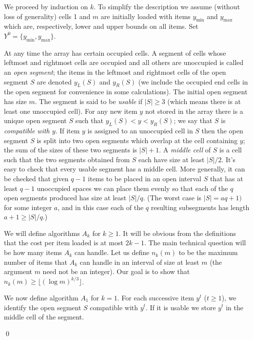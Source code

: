 \documentclass[unicode,review]{siamart1116}
\newenvironment{proofof}[1]{\noindent{\textbf { Proof of #1:}}} {{\qed}}
\numberwithin{theorem}{section}
\begin{document}
\begin{proofof}{\Cref{thm:ub}}
We proceed by induction on $k$. To simplify the description we assume (without loss of generality)
cells 1 and $m$ are initially loaded with items $y_{\min}$ and $y_{\max}$ which are, respectively, lower and upper bounds
on all items. Set $Y^0 = \{y_{\min}, y_{\max}\}$.



At any time the array has certain occupied cells.   A segment of cells whose leftmost and rightmost cells are occupied
and all others are unoccupied is called an {\em open segment}; the items in the leftmost and rightmost cells of the open segment
$S$ are denoted $y_L(S)$ and $y_R(S)$ (we include the occupied end cells in the open segment for convenience
in some calculations).  The initial open segment has size $m$.
The segment is said to be {\em usable} if $|S| \geq 3$ (which means there is at least one unoccupied cell).
For any new item $y$ not stored in the array
there is a unique open segment $S$ such that $y_L(S)<y<y_R(S)$; we say that $S$ is  {\em compatible with $y$}.
If item $y$ is assigned to an unoccupied cell in $S$  then the open segment $S$ is split into two open
segments which overlap at the cell containing $y$; the sum of the sizes of these two segments is $|S|+1$.
A {\em middle cell} of $S$ is a cell such that the two segments obtained from $S$ each have size at least $|S|/2$. It's easy
to check that every usable segment has a middle cell.  More generally, it can be checked that given $q-1$ items to be placed in an open
interval $S$ that has at least $q-1$ unoccupied spaces we can place them evenly so that each of the $q$
open segments produced has size at least $|S|/q$.  (The worst case is $|S|=aq+1)$ for some integer $a$, and
in this case each of the $q$ resulting subsegments has length $a+1 \geq |S|/q$.)



We will define algorithms $A_k$ for $k \geq 1$.  It will be obvious from the definitions that the cost per item
loaded is at most $2k-1$.  The main technical question will be how many items $A_k$ can handle.  Let us define $n_k(m)$ to be the
maximum number of items that $A_k$ can handle in an interval of size at least $m$ (the argument $m$ need not be an integer).  
Our goal is to show that $n_k(m) \geq \lfloor (\log m)^{k/3} \rfloor$.



We now define algorithm $A_1$ for $k=1$.   For each successive item $y^t$ ($t \geq 1$), we identify the
open segment $S$ compatible with $y^t$.  If it is usable we store $y^t$ in the middle cell of the segment. 



\end{proofof}
\end{document}
